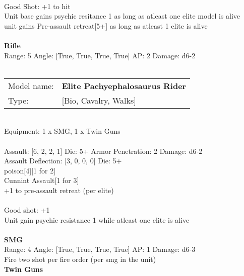 \ \\
Good Shot: +1 to hit\\ 
Unit base gains psychic resitance 1 as long as atleast one elite model is alive\\ 
unit gains Pre-assault retreat[5+] as long as atleast 1 elite is alive\\ 

\ \\
{\bf Rifle } \\



Range: 5  Angle: [True, True, True, True] AP: 2 Damage: d6-2 \\




 
\ \\


\begin{tabular}{ll}
Model name: & {\bf Elite Pachyephalosaurus Rider } \\
Type: & [Bio, Cavalry, Walks] \\
\end{tabular}
\ \\
Equipment: 1 x SMG, 1 x Twin Guns \\
\ \\
Assault: [6, 2, 2, 1] Die: 5+ Armor Penetration: 2 Damage: d6-2 \\
Assault Deflection: [3, 0, 0, 0] Die: 5+\\
\indent poison[4][1 for 2]\\ 
Cunnint Assault[1 for 3]\\ 
+1 to pre-assault retreat (per elite)\\ 
 
\ \\
Good shot: +1\\ 
Unit gain psychic resistance 1 while atleast one elite is alive\\ 

\ \\
{\bf SMG } \\



Range: 4  Angle: [True, True, True, True] AP: 1 Damage: d6-3 \\
Fire two shot per fire order (per smg in the unit)\\ 




{\bf Twin Guns } \\



